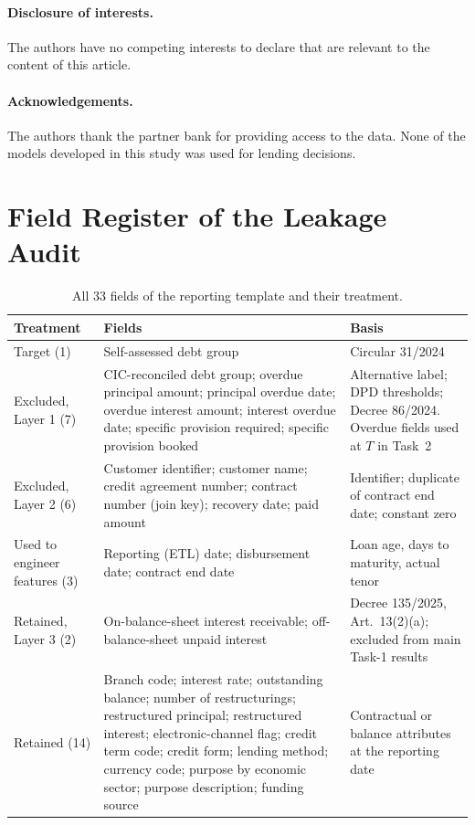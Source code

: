 \documentclass[runningheads]{llncs}
\begin{document}
\paragraph{Disclosure of interests.} The authors have no competing interests to declare that are relevant to the content of this article.

\paragraph{Acknowledgements.} The authors thank the partner bank for providing access to the data. None of the models developed in this study was used for lending decisions.

\appendix

\section{Field Register of the Leakage Audit}
\label{app:register}

\begin{table}[h]
\centering
\caption{All 33 fields of the reporting template and their treatment.}
\label{tab:register}
\scriptsize
\begin{tabular}{@{}>{\raggedright\arraybackslash}p{2.6cm}>{\raggedright\arraybackslash}p{6.6cm}>{\raggedright\arraybackslash}p{2.4cm}@{}}
\toprule
Treatment & Fields & Basis\\
\midrule
Target (1) & Self-assessed debt group & Circular 31/2024\\
Excluded, Layer 1 (7) & CIC-reconciled debt group; overdue principal amount; principal overdue date; overdue interest amount; interest overdue date; specific provision required; specific provision booked & Alternative label; DPD thresholds; Decree 86/2024. Overdue fields used at $T$ in Task~2\\
Excluded, Layer 2 (6) & Customer identifier; customer name; credit agreement number; contract number (join key); recovery date; paid amount & Identifier; duplicate of contract end date; constant zero\\
Used to engineer features (3) & Reporting (ETL) date; disbursement date; contract end date & Loan age, days to maturity, actual tenor\\
Retained, Layer 3 (2) & On-balance-sheet interest receivable; off-balance-sheet unpaid interest & Decree 135/2025, Art.~13(2)(a); excluded from main Task-1 results\\
Retained (14) & Branch code; interest rate; outstanding balance; number of restructurings; restructured principal; restructured interest; electronic-channel flag; credit term code; credit form; lending method; currency code; purpose by economic sector; purpose description; funding source & Contractual or balance attributes at the reporting date\\
\bottomrule
\end{tabular}
\end{table}



\end{document}
